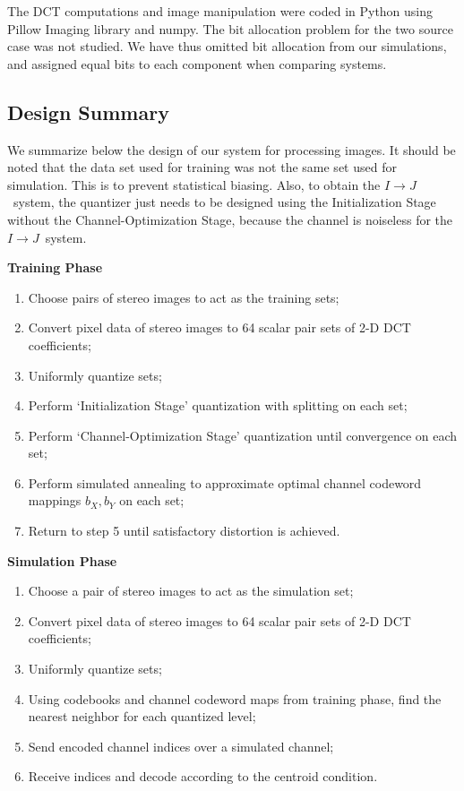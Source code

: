 \documentclass[10pt,twoside,titlepage]{article}
\newcommand{\sysIJ}{\mbox{$I \rightarrow J$}}
\begin{document}
The DCT computations and image manipulation were coded in Python using Pillow Imaging library and numpy. The bit allocation problem for the two source case was not studied. We have thus omitted bit allocation from our simulations, and assigned equal bits to each component when comparing systems.


\subsection{Design Summary}
We summarize below the design of our system for processing images. It should be noted that the data set used for training was not the same set used for simulation. This is to prevent statistical biasing. Also, to obtain the \sysIJ\ system, the quantizer just needs to be designed using the Initialization Stage without the Channel-Optimization Stage, because the channel is noiseless for the \sysIJ\ system.

\medskip
{\noindent \bf Training Phase}
\begin{enumerate}
    \item Choose pairs of stereo images to act as the training sets;
    \item Convert pixel data of stereo images to 64 scalar pair sets of 2-D DCT coefficients;
    \item Uniformly quantize sets;
    \item Perform `Initialization Stage' quantization with splitting on each set;
    \item Perform `Channel-Optimization Stage' quantization until convergence on each set;
    \item Perform simulated annealing to  approximate optimal channel codeword mappings $b_X, b_Y$ on each set;
    \item Return to step 5 until satisfactory distortion is achieved.
\end{enumerate}
\medskip
{\noindent \bf Simulation Phase}
\begin{enumerate}
    \item Choose a pair of stereo images to act as the simulation set;
    \item Convert pixel data of stereo images to 64 scalar pair sets of 2-D DCT coefficients;
    \item Uniformly quantize sets;
    \item Using codebooks and channel codeword maps from training phase, find the nearest neighbor for each quantized level;
    \item Send encoded channel indices over a simulated channel;
    \item Receive indices and decode according to the centroid condition.
\end{enumerate}
\end{document}
